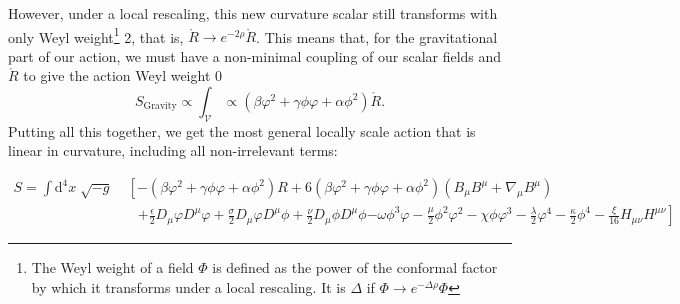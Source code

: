 \documentclass[aps,prd,reprint,preprintnumbers,showpacs,floatfix,nofootinbib,superscript address]{revtex4-2}
\newcommand{\wb}[1]{{\color[RGB]{255,0,0}{\textbf{\textit{[WB: #1]}}}}}
\newcommand{\pcs}[1]{{\color[RGB]{0,100,0}{\textbf{\textit{[PCS: #1]}}}}}
\begin{document}
However, under a local rescaling, this new curvature scalar still transforms with only Weyl weight\footnote{The Weyl weight of a field $\Phi$ is defined as the power of the conformal factor by which it transforms under a local rescaling. It is $\Delta$ if $\Phi \rightarrow e^{-\Delta\rho}\Phi$} 2, that is, $\mathring{R} \rightarrow e^{-2\rho} \mathring{R}$. This means that, for the gravitational part of our action, we must have a non-minimal coupling of our scalar fields and $\mathring{R}$ to give the action Weyl weight 0
\begin{equation}
        S_\text{Gravity} \propto \int_\mathcal{V} \propto ( \beta \varphi^2 + \gamma \phi \varphi +\alpha \phi^2) \mathring{R} .
\end{equation}
Putting all this together, we get the most general locally scale action that is linear in curvature, including all non-irrelevant terms:
\begin{widetext} 
    \begin{align}  \label{Starting Action} 
        S =\int \text{d}^4x\; \sqrt{-g} &\; \left[ -( \beta \varphi^2 + \gamma \phi \varphi +\alpha \phi^2) R + 6( \beta \varphi^2 + \gamma \phi \varphi +\alpha \phi^2) (B_{\mu} B^{\mu} + \nabla_\mu B^\mu) \right. \nonumber \\
        &\quad \left. +\frac{\epsilon}{2} D_{\mu}\varphi D^{\mu}\varphi + \frac{\sigma}{2} D_{\mu}\varphi D^{\mu}\phi + \frac{\nu}{2} D_{\mu}\phi D^{\mu}\phi \right. \left. - \omega \phi^3 \varphi - \frac{\mu}{2} \phi^2 \varphi^2  - \chi \phi \varphi^3 - \frac{\lambda}{2} \varphi^4 - \frac{\kappa}{2} \phi^4 - \frac{\xi}{16} H_{\mu\nu}H^{\mu\nu} \right]  
    \end{align}
\end{widetext}

\end{document}
